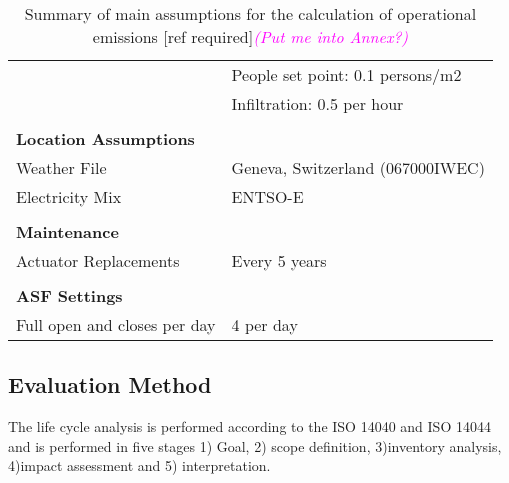 \begin{table}[H]
\begin{tabular}{ll}
                              & People set point: 0.1 persons/m2               \\
                              & Infiltration: 0.5 per hour                     \\
                              &                                                \\
\textbf{Location Assumptions} &                                                \\
Weather File                  & Geneva, Switzerland (067000IWEC)              \\
Electricity Mix               & ENTSO-E\cite{itten2012life}                                           \\
                              &                                                \\
\textbf{Maintenance}          &                                                \\
Actuator Replacements         & Every 5 years                                  \\
                              &                                                \\
\textbf{ASF Settings}         &                                                \\
Full open and closes per day  & 4 per day                                      \\
\hline
\end{tabular}
\caption{Summary of main assumptions for the calculation of operational emissions [ref required]\textcolor{magenta}{\textit{(Put me into Annex?)}}}
\label{tab:AssumptionsOpp}
\end{table}



\subsection{Evaluation Method}
The life cycle analysis is performed according to the ISO 14040 and ISO 14044 and is performed in five stages 1) Goal, 2) scope definition, 3)inventory analysis, 4)impact assessment and 5) interpretation.\\ %


